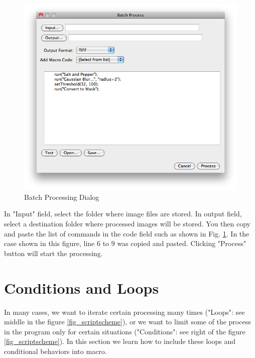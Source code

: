 \documentclass[11pt,a4paper,oneside]{report}
\begin{document}
\begin{figure}[htbp]
\begin{center}
\includegraphics[scale=0.4]{fig/BatchProcessing.png}
\caption{Batch Processing Dialog} \label{fig_BatchProcessInterface}
\end{center}
\end{figure}

In "Input" field, select the folder where image files are stored. 
In output field, select a destination folder where processed images will be stored. 
You then copy and paste the list of commands in the code field such as 
shown in Fig. \ref{fig_BatchProcessInterface}. 
In the case shown in this figure, line 6 to 9 was copied and pasted. 
Clicking "Process" button will start the processing.
\newpage

\section{Conditions and Loops}
In many cases, we want to iterate certain processing many times ("Loops": see middle in the figure \ref{fig_scriptscheme}), or we want to limit some of the process in the program only for certain situations ("Conditions": see right of the figure \ref{fig_scriptscheme}). In this section we learn how to include these loops and conditional behaviors into macro. 
\end{document}
